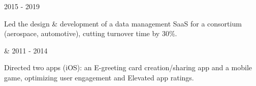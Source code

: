 \begin{cventries}

  \cventrythin
    {} %
    {2015 - 2019} %
    {
          \begin{cvitems} %
			\item {Led the design \& development of a data management SaaS for a consortium (aerospace, automotive), cutting turnover time by 30\%.} 
	      \end{cvitems}
    }
    



  \cventrythin
    { \& } %
    {2011 - 2014} %
    {
          \begin{cvitems} %
				\item {Directed two apps (iOS): an E-greeting card creation/sharing app and a mobile game, optimizing user engagement and Elevated app ratings.}
	      \end{cvitems}
    }



\end{cventries}
